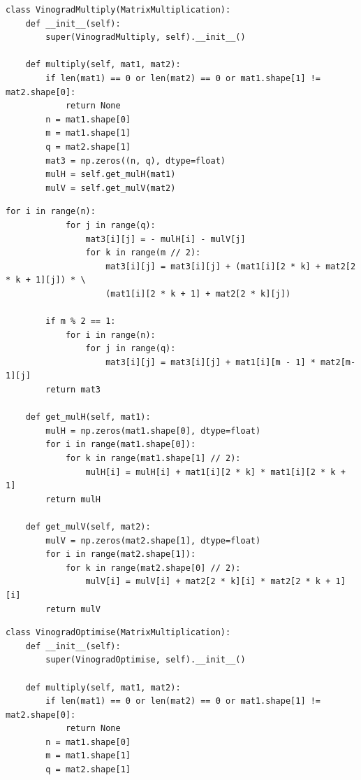 \documentclass[a4paper,oneside,14pt]{extreport}
\begin{document}
\begin{lstlisting}[caption=Алгоритм Копперсмита-Винограда (часть 1), label={lst:Vinograd}]
class VinogradMultiply(MatrixMultiplication):
	def __init__(self):
		super(VinogradMultiply, self).__init__()
	
	def multiply(self, mat1, mat2):
		if len(mat1) == 0 or len(mat2) == 0 or mat1.shape[1] != mat2.shape[0]:
			return None
		n = mat1.shape[0]
		m = mat1.shape[1]
		q = mat2.shape[1]
		mat3 = np.zeros((n, q), dtype=float)
		mulH = self.get_mulH(mat1)
		mulV = self.get_mulV(mat2)
\end{lstlisting}
\newpage
\begin{lstlisting}[caption=Алгоритм Копперсмита-Винограда (часть 2)]
		for i in range(n):
			for j in range(q):
				mat3[i][j] = - mulH[i] - mulV[j]
				for k in range(m // 2):
					mat3[i][j] = mat3[i][j] + (mat1[i][2 * k] + mat2[2 * k + 1][j]) * \
					(mat1[i][2 * k + 1] + mat2[2 * k][j])
				
		if m % 2 == 1:
			for i in range(n):
				for j in range(q):
					mat3[i][j] = mat3[i][j] + mat1[i][m - 1] * mat2[m-1][j]
		return mat3
		
	def get_mulH(self, mat1):
		mulH = np.zeros(mat1.shape[0], dtype=float)
		for i in range(mat1.shape[0]):
			for k in range(mat1.shape[1] // 2):
				mulH[i] = mulH[i] + mat1[i][2 * k] * mat1[i][2 * k + 1]
		return mulH
	
	def get_mulV(self, mat2):
		mulV = np.zeros(mat2.shape[1], dtype=float)
		for i in range(mat2.shape[1]):
			for k in range(mat2.shape[0] // 2):
				mulV[i] = mulV[i] + mat2[2 * k][i] * mat2[2 * k + 1][i]
		return mulV
\end{lstlisting}
\begin{lstlisting}[caption=Оптимизированный алгоритм Копперсмита-Винограда (часть 1), label={lst:optVinograd}]
class VinogradOptimise(MatrixMultiplication):
	def __init__(self):
		super(VinogradOptimise, self).__init__()
	
	def multiply(self, mat1, mat2):
		if len(mat1) == 0 or len(mat2) == 0 or mat1.shape[1] != mat2.shape[0]:
			return None
		n = mat1.shape[0]
		m = mat1.shape[1]
		q = mat2.shape[1]
\end{lstlisting}
\newpage
\end{document}
